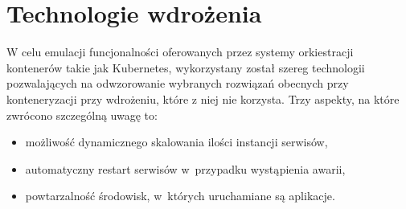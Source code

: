 \section{Technologie wdrożenia}
W celu emulacji funcjonalności oferowanych przez systemy orkiestracji kontenerów takie jak Kubernetes, wykorzystany został szereg technologii pozwalających na odwzorowanie wybranych rozwiązań obecnych przy konteneryzacji przy wdrożeniu, które z niej nie korzysta. Trzy aspekty, na które zwrócono szczególną uwagę to:
\begin{itemize}
	\item możliwość dynamicznego skalowania ilości instancji serwisów,
	\item automatyczny restart serwisów w~przypadku wystąpienia awarii,
	\item powtarzalność środowisk, w~których uruchamiane są aplikacje.
\end{itemize}
